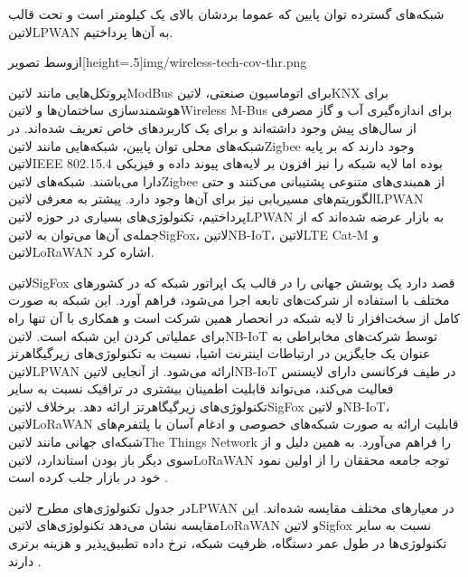  شبکه‌های گسترده توان پایین که عموما بردشان بالای یک کیلومتر است و تحت قالب ‌لاتین{LPWAN} به آن‌ها پرداختیم.

‌ازوسط
‌تصویر[height=.5\textwidth]{img/wireless-tech-cov-thr.png}

پروتکل‌هایی مانند ‌لاتین{ModBus} برای اتوماسیون صنعتی، ‌لاتین{KNX} برای هوشمند‌سازی ساختمان‌ها و ‌لاتین{Wireless M-Bus} برای اندازه‌گیری آب و گاز مصرفی از سال‌های پیش وجود داشته‌اند
و برای یک کاربردهای خاص تعریف شده‌اند.
در شبکه‌های محلی توان پایین، شبکه‌هایی مانند ‌لاتین{Zigbee} وجود دارند که بر پایه ‌لاتین{IEEE 802.15.4} بوده اما لایه شبکه را نیز افزون بر لایه‌های پیوند داده و فیزیکی دارا می‌باشند. شبکه‌های ‌لاتین{Zigbee}
از همبندی‌های متنوعی پشتیبانی می‌کنند و حتی الگوریتم‌های مسیریابی نیز برای آن‌ها وجود دارد.
پیشتر به معرفی ‌لاتین{LPWAN} پرداختیم، تکنولوژی‌های بسیاری در حوزه ‌لاتین{LPWAN} به بازار عرضه شده‌اند که از جمله‌ی آن‌ها می‌توان به ‌لاتین{SigFox}، ‌لاتین{NB-IoT}، ‌لاتین{LTE Cat-M} و ‌لاتین{LoRaWAN}
اشاره کرد.

‌لاتین{SigFox} قصد دارد یک پوشش جهانی را در قالب یک اپراتور شبکه که در کشورهای مختلف با استفاده از شرکت‌های تابعه اجرا می‌شود، فراهم آورد.
این شبکه به صورت کامل از سخت‌افزار تا لایه شبکه در انحصار همین شرکت است و همکاری با آن تنها راه برای عملیاتی کردن این شبکه است.
‌لاتین{NB-IoT} توسط شرکت‌های مخابراطی به عنوان یک جایگزین در ارتباطات اینترنت اشیا، نسبت به تکنولوژی‌های زیرگیگاهرتز ‌لاتین{LPWAN} ارائه می‌شود.
از آنجایی ‌لاتین{NB-IoT} در طیف فرکانسی دارای لایسنس فعالیت می‌کند، می‌تواند قابلیت اطمینان بیشتری در ترافیک نسبت به سایر تکنولوژی‌های زیرگیگاهرتز ارائه دهد.
برخلاف ‌لاتین{SigFox} و ‌لاتین{NB-IoT}، ‌لاتین{LoRaWAN} قابلیت ارائه به صورت شبکه‌های خصوصی و ادغام آسان با پلتفرم‌های شبکه‌ای جهانی مانند ‌لاتین{The Things Network} را فراهم می‌آورد.
به همین دلیل و از سوی دیگر باز بودن استاندارد، ‌لاتین{LoRaWAN} توجه جامعه محققان را از اولین نمود خود در بازار جلب کرده است
.

در جدول  تکنولوژی‌های مطرح ‌لاتین{LPWAN} در معیارهای مختلف مقایسه شده‌اند. این مقایسه نشان می‌دهد تکنولوژی‌های ‌لاتین{LoRaWAN}
و ‌لاتین{Sigfox} نسبت به سایر تکنولوژی‌ها در طول عمر دستگاه، ظرفیت شبکه، نرخ داده تطبیق‌پذیر و هزینه برتری دارند .

